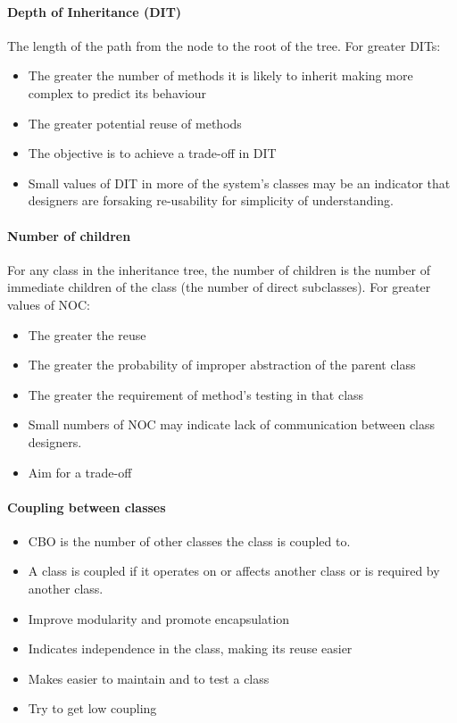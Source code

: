 \paragraph{Depth of Inheritance (DIT)}\label{par:depth_of_inheritance_dit_}

The length of the path from the node to the root of the tree.
For greater DITs:
\begin{itemize}
	\item The greater the number of methods it is likely to inherit making more complex to predict its behaviour
	\item The greater potential reuse of methods
	\item The objective is to achieve a trade-off in DIT
	\item Small values of DIT in more of the system's classes may be an indicator that designers are forsaking re-usability for simplicity of understanding.
\end{itemize}

\paragraph{Number of children}\label{par:number_of_children}

For any class in the inheritance tree, the number of children is the number of immediate children of the class (the number of direct subclasses).
For greater values of NOC:
\begin{itemize}
	\item The greater the reuse
	\item The greater the probability of improper abstraction of the parent class
	\item The greater the requirement of method's testing in that class
	\item Small numbers of NOC may indicate lack of communication between class designers.
	\item Aim for a trade-off
\end{itemize}

\paragraph{Coupling between classes}\label{par:coupling_between_classes}

\begin{itemize}
	\item CBO is the number of other classes the class is coupled to.
	\item A class is coupled if it operates on or affects another class or is required by another class.
	\item Improve modularity and promote encapsulation
	\item Indicates independence in the class, making its reuse easier
	\item Makes easier to maintain and to test a class
	\item Try to get low coupling
\end{itemize}

